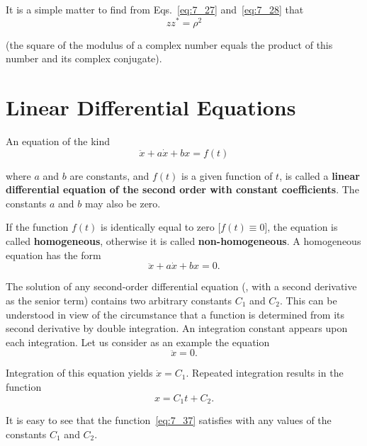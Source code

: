 It is a simple matter to find from Eqs.~\eqref{eq:7_27} and~\eqref{eq:7_28} that
\begin{equation}\label{eq:7_33}
	zz^* = \rho^2
\end{equation}

\noindent
(the square of the modulus of a complex number equals the product of this number and its complex conjugate).

\section{Linear Differential Equations}\label{sec:7_4}

An equation of the kind
\begin{equation}\label{eq:7_34}
	\ddot{x} + a\dot{x} + bx = f(t)
\end{equation}

\noindent
where $a$ and $b$ are constants, and $f(t)$ is a given function of $t$, is called a \textbf{linear differential equation of the second order with constant coefficients}. The constants $a$ and $b$ may also be zero. 

If the function $f(t)$ is identically equal to zero [$f(t)\equiv 0$], the equation is called \textbf{homogeneous}, otherwise it is called \textbf{non-homogeneous}. A homogeneous equation has the form
\begin{equation}\label{eq:7_35}
	\ddot{x} + a\dot{x} + bx = 0.
\end{equation}

The solution of any second-order differential equation (\ie, with a second derivative as the senior term) contains two arbitrary constants $C_1$ and $C_2$. This can be understood in view of the circumstance that a function is determined from its second derivative by double integration. An integration constant appears upon each integration. Let us consider as an example the equation
\begin{equation}\label{eq:7_36}
	\ddot{x} = 0.
\end{equation}

\noindent
Integration of this equation yields $\dot{x}=C_1$. Repeated integration results in the function
\begin{equation}\label{eq:7_37}
	x = C_1 t + C_2.
\end{equation}

\noindent
It is easy to see that the function~\eqref{eq:7_37} satisfies  with any values of the constants $C_1$ and $C_2$.


